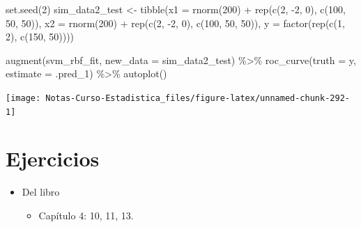\documentclass[
  12pt,
]{book}
\newenvironment{Shaded}{\begin{snugshade}}{\end{snugshade}}
\newcommand{\AttributeTok}[1]{\textcolor[rgb]{0.77,0.63,0.00}{#1}}
\newcommand{\DecValTok}[1]{\textcolor[rgb]{0.00,0.00,0.81}{#1}}
\newcommand{\FunctionTok}[1]{\textcolor[rgb]{0.00,0.00,0.00}{#1}}
\newcommand{\NormalTok}[1]{#1}
\newcommand{\OtherTok}[1]{\textcolor[rgb]{0.56,0.35,0.01}{#1}}
\newcommand{\SpecialCharTok}[1]{\textcolor[rgb]{0.00,0.00,0.00}{#1}}
\providecommand{\tightlist}{%
  \setlength{\itemsep}{0pt}\setlength{\parskip}{0pt}}
\theoremstyle{definition}
\theoremstyle{definition}
\theoremstyle{definition}
\theoremstyle{definition}
\theoremstyle{remark}
\begin{document}
\begin{Shaded}
\begin{Highlighting}[]
\FunctionTok{set.seed}\NormalTok{(}\DecValTok{2}\NormalTok{)}
\NormalTok{sim\_data2\_test }\OtherTok{\textless{}{-}} \FunctionTok{tibble}\NormalTok{(}\AttributeTok{x1 =} \FunctionTok{rnorm}\NormalTok{(}\DecValTok{200}\NormalTok{) }\SpecialCharTok{+} \FunctionTok{rep}\NormalTok{(}\FunctionTok{c}\NormalTok{(}\DecValTok{2}\NormalTok{,}
    \SpecialCharTok{{-}}\DecValTok{2}\NormalTok{, }\DecValTok{0}\NormalTok{), }\FunctionTok{c}\NormalTok{(}\DecValTok{100}\NormalTok{, }\DecValTok{50}\NormalTok{, }\DecValTok{50}\NormalTok{)), }\AttributeTok{x2 =} \FunctionTok{rnorm}\NormalTok{(}\DecValTok{200}\NormalTok{) }\SpecialCharTok{+} \FunctionTok{rep}\NormalTok{(}\FunctionTok{c}\NormalTok{(}\DecValTok{2}\NormalTok{,}
    \SpecialCharTok{{-}}\DecValTok{2}\NormalTok{, }\DecValTok{0}\NormalTok{), }\FunctionTok{c}\NormalTok{(}\DecValTok{100}\NormalTok{, }\DecValTok{50}\NormalTok{, }\DecValTok{50}\NormalTok{)), }\AttributeTok{y =} \FunctionTok{factor}\NormalTok{(}\FunctionTok{rep}\NormalTok{(}\FunctionTok{c}\NormalTok{(}\DecValTok{1}\NormalTok{, }\DecValTok{2}\NormalTok{),}
    \FunctionTok{c}\NormalTok{(}\DecValTok{150}\NormalTok{, }\DecValTok{50}\NormalTok{))))}
\end{Highlighting}
\end{Shaded}

\begin{Shaded}
\begin{Highlighting}[]
\FunctionTok{augment}\NormalTok{(svm\_rbf\_fit, }\AttributeTok{new\_data =}\NormalTok{ sim\_data2\_test) }\SpecialCharTok{\%\textgreater{}\%}
    \FunctionTok{roc\_curve}\NormalTok{(}\AttributeTok{truth =}\NormalTok{ y, }\AttributeTok{estimate =}\NormalTok{ .pred\_1) }\SpecialCharTok{\%\textgreater{}\%}
    \FunctionTok{autoplot}\NormalTok{()}
\end{Highlighting}
\end{Shaded}

\begin{center}\texttt{[image: Notas-Curso-Estadistica\_files/figure-latex/unnamed-chunk-292-1]} \end{center}

\hypertarget{ejercicios-5}{%
\section{Ejercicios}\label{ejercicios-5}}

\begin{itemize}
\tightlist
\item
  Del libro \autocite{James2013b}

  \begin{itemize}
  \tightlist
  \item
    Capítulo 4: 10, 11, 13.
  \end{itemize}
\end{itemize}
\end{document}
